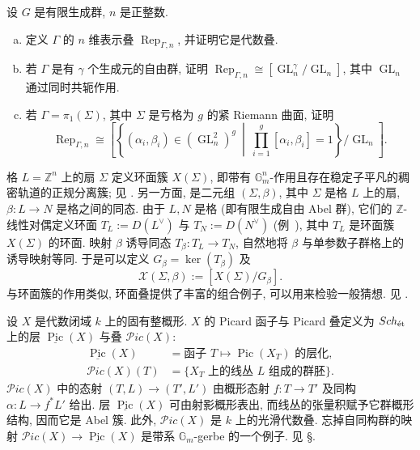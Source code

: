 \begin{exercise}[表示叠]\label{src:4.9.30}
设 $G$ 是有限生成群, $n$ 是正整数.
\begin{enumerate}[(a)]
\item 定义 $\Gamma$ 的 $n$ 维表示叠 $\operatorname{Rep}_{\Gamma,n}$, 并证明它是代数叠.
\item 若 $\Gamma$ 是有 $\gamma$ 个生成元的自由群, 证明 $\operatorname{Rep}_{\Gamma,n}\cong[\operatorname{GL}_n^\gamma/\operatorname{GL}_n]$, 其中 $\operatorname{GL}_n$ 通过同时共轭作用.
\item 若 $\Gamma=\pi_1(\Sigma)$, 其中 $\Sigma$ 是亏格为 $g$ 的紧 Riemann 曲面, 证明
\[
\operatorname{Rep}_{\Gamma,n}\cong
\left[\left\{(\alpha_i,\beta_i)\in(\operatorname{GL}_n^2)^g\ \middle|\
\prod_{i=1}^g[\alpha_i,\beta_i]=1\right\}/\operatorname{GL}_n\right].
\]
\end{enumerate}
\end{exercise}
\begin{example}[环面叠]\label{src:4.9.31}
格 $L=\mathbb Z^n$ 上的扇 $\Sigma$ 定义环面簇 $X(\Sigma)$, 即带有 $\mathbb G_m^n$-作用且存在稳定子平凡的稠密轨道的正规分离簇; 见 \cite{Ful93}. 另一方面,  是二元组 $(\Sigma,\beta)$, 其中 $\Sigma$ 是格 $L$ 上的扇, $\beta:L\to N$ 是格之间的同态. 由于 $L,N$ 是格 (即有限生成自由 Abel 群), 它们的 $\mathbb Z$-线性对偶定义环面 $T_L:=D(L^\vee)$ 与 $T_N:=D(N^\vee)$ (例~), 其中 $T_L$ 是环面簇 $X(\Sigma)$ 的环面. 映射 $\beta$ 诱导同态 $T_\beta:T_L\to T_N$, 自然地将 $\beta$ 与单参数子群格上的诱导映射等同. 于是可以定义 $G_\beta=\ker(T_\beta)$ 及
\[
\mathcal X(\Sigma,\beta):=[X(\Sigma)/G_\beta].
\]
与环面簇的作用类似, 环面叠提供了丰富的组合例子, 可以用来检验一般猜想. 见 \cite{FMN10,GS17}.
\end{example}
\begin{example}[Picard 概形与叠]\label{src:4.9.32}
设 $X$ 是代数闭域 $k$ 上的固有整概形. $X$ 的 Picard 函子与 Picard 叠定义为 $Sch_{\text{ét}}$ 上的层 $\underline{\operatorname{Pic}}(X)$ 与叠 $\mathcal{P}ic(X)$:
\[
\begin{aligned}
\underline{\operatorname{Pic}}(X)&=\text{函子 }T\longmapsto\operatorname{Pic}(X_T)\text{ 的层化},\\
\mathcal{P}ic(X)(T)&=\{X_T\text{ 上的线丛 }L\text{ 组成的群胚}\}.
\end{aligned}
\]
$\mathcal{P}ic(X)$ 中的态射 $(T,L)\to(T',L')$ 由概形态射 $f:T\to T'$ 及同构 $\alpha:L\to f^*L'$ 给出. 层 $\underline{\operatorname{Pic}}(X)$ 可由射影概形表出, 而线丛的张量积赋予它群概形结构, 因而它是 Abel 簇. 此外, $\mathcal{P}ic(X)$ 是 $k$ 上的光滑代数叠. 忘掉自同构群的映射 $\mathcal{P}ic(X)\to\underline{\operatorname{Pic}}(X)$ 是带系 $\mathbb G_m$-gerbe 的一个例子. 见 \S{}.
\end{example}
